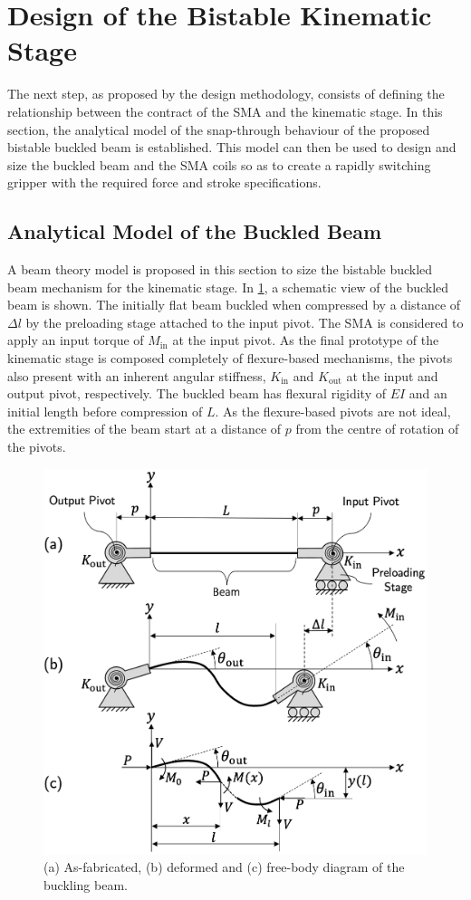 \section{Design of the Bistable Kinematic Stage}
The next step, as proposed by the design methodology, consists of defining the relationship between the contract of the SMA and the kinematic stage. In this section, the analytical model of the snap-through behaviour of the proposed bistable buckled beam is established. This model can then be used to design and size the buckled beam and the SMA coils so as to create a rapidly switching gripper with the required force and stroke specifications.
\subsection{Analytical Model of the Buckled Beam}
A beam theory model is proposed in this section to size the bistable buckled beam mechanism for the kinematic stage. In \cref{fig:buckled-beam-schematic}, a schematic view of the buckled beam is shown. The initially flat beam buckled when compressed by a distance of $\Delta l$ by the preloading stage attached to the input pivot. The SMA is considered to apply an input torque of $M_\mathrm{in}$ at the input pivot. As the final prototype of the kinematic stage is composed completely of flexure-based mechanisms, the pivots also present with an inherent angular stiffness, $K_\mathrm{in}$ and $K_\mathrm{out}$ at the input and output pivot, respectively. The buckled beam has  flexural rigidity of $EI$ and an initial length before compression of $L$. As the flexure-based pivots are not ideal, the extremities of the beam start at a distance of $p$ from the centre of rotation of the pivots.
\begin{figure}[hbt!] %
  \centering
  \includegraphics[width=0.7\columnwidth]{images/chap7/buckled_beam_model.png}
  \caption{(a) As-fabricated, (b) deformed and (c) free-body diagram of the buckling beam.}
  \label{fig:buckled-beam-schematic}
\end{figure}

